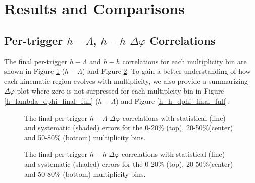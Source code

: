 \documentclass[ALICE,manyauthors]{ALICE_analysis_notes}
\begin{document}
\section{Results and Comparisons}
\label{results}
\subsection{Per-trigger $h-\Lambda$, $h-h$ $\Delta\varphi$ Correlations}
The final per-trigger $h-\Lambda$ and $h-h$ correlations for each multiplicity bin are shown in Figure \ref{h_lambda_dphi_final} ($h-\Lambda$) and Figure \ref{h_h_dphi_final}. To gain a better understanding of how each kinematic region evolves with multiplicity, we also provide a summarizing $\Delta\varphi$ plot where zero is not surpressed for each multiplcity bin in Figure \ref{h_lambda_dphi_final_full} ($h-\Lambda$) and Figure \ref{h_h_dphi_final_full}.

\begin{figure}[ht]
\centering
\begin{subfigure}{
\texttt{[image: figures/h\_lambda\_dphi\_0\_20\_final.pdf]}}
\end{subfigure}
\begin{subfigure}{
\texttt{[image: figures/h\_lambda\_dphi\_20\_50\_final.pdf]}}
\end{subfigure}
\begin{subfigure}{
\texttt{[image: figures/h\_lambda\_dphi\_50\_80\_final.pdf]}}
\end{subfigure}
\caption{The final per-trigger $h-\Lambda$ $\Delta\varphi$ correlations with statistical (line) and systematic (shaded) errors for the 0-20\% (top), 20-50\%(center) and 50-80\% (bottom) multiplicity bins.}
\label{h_lambda_dphi_final}
\end{figure}
	
\begin{figure}[ht]
\centering
\begin{subfigure}{
\texttt{[image: figures/h\_h\_dphi\_0\_20\_final.pdf]}}
\end{subfigure}
\begin{subfigure}{
\texttt{[image: figures/h\_h\_dphi\_20\_50\_final.pdf]}}
\end{subfigure}
\begin{subfigure}{
\texttt{[image: figures/h\_h\_dphi\_50\_80\_final.pdf]}}
\end{subfigure}
\caption{The final per-trigger $h-h$ $\Delta\varphi$ correlations with statistical (line) and systematic (shaded) errors for the 0-20\% (top), 20-50\%(center) and 50-80\% (bottom) multiplicity bins.}
\label{h_h_dphi_final}
\end{figure}
\end{document}
